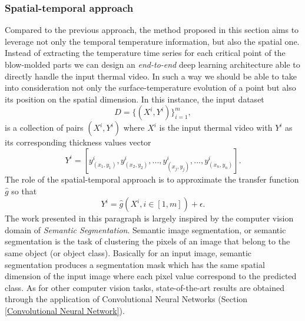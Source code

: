 \subsubsection{Spatial-temporal approach} \label{Spatial-temporal approach}

Compared to the previous approach, the method proposed in this section aims to leverage not only the temporal temperature information, but also the spatial one. Instead of extracting the temperature time series for each critical point of the blow-molded parts we can design an \textit{end-to-end} deep learning architecture able to directly handle the input thermal video. In such a way we should be able to take into consideration not only the surface-temperature evolution of a point but also its position on the spatial dimension. 
In this instance, the input dataset
\begin{equation}
    D = \{(X^{i}, Y^{i})\}_{i=1}^{m},
\end{equation}
is a collection of pairs $(X^{i}, Y^{i})$ where $X^{i}$ is the input thermal video with $Y^{i}$ as its corresponding thickness values vector
\begin{equation}
    Y^{i} = [y^{i}_{(x_1, y_1)}, y^{i}_{(x_2, y_2)}, ..., y^{i}_{(x_j, y_j)}, ..., y^{i}_{(x_n, y_n)}].
\end{equation}
The role of the spatial-temporal approach is to approximate the transfer function $\hat{g}$ so that
\begin{equation}
    Y^{i} = \hat{g}(X^{i}, i \in [1, m]) + \epsilon.
\end{equation}
The work presented in this paragraph is largely inspired by the computer vision domain of \textit{Semantic Segmentation}. Semantic image segmentation, or semantic segmentation is the task of clustering the pixels of an image that belong to the same object (or object class). Basically for an input image, semantic segmentation produces a segmentation mask which has the same spatial dimension of the input image where each pixel value correspond to the predicted class. As for other computer vision tasks, state-of-the-art results are obtained through the application of Convolutional Neural Networks (Section \ref{Convolutional Neural Network}).

